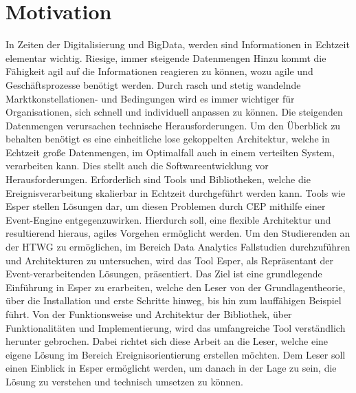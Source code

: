 \chapter{Motivation}
In Zeiten der Digitalisierung und BigData, werden sind Informationen in Echtzeit elementar wichtig.
Riesige, immer steigende Datenmengen
Hinzu kommt die Fähigkeit agil auf die Informationen reagieren zu können, wozu agile und Geschäftsprozesse benötigt werden. 
Durch rasch und stetig wandelnde Marktkonstellationen- und Bedingungen wird es immer wichtiger für Organisationen, sich schnell und individuell anpassen zu können. Die steigenden Datenmengen verursachen technische Herausforderungen. Um den Überblick zu behalten benötigt es eine einheitliche lose gekoppelten Architektur, welche in Echtzeit große Datenmengen, im Optimalfall auch in einem verteilten System, verarbeiten kann. Dies stellt auch die Softwareentwicklung vor Herausforderungen.
Erforderlich sind Tools und Bibliotheken, welche die Ereignisverarbeitung skalierbar in Echtzeit durchgeführt werden kann. Tools wie Esper stellen Lösungen dar, um diesen Problemen durch CEP mithilfe einer Event-Engine entgegenzuwirken. Hierdurch soll, eine flexible Architektur und resultierend hieraus, agiles Vorgehen ermöglicht werden.
Um den Studierenden an der HTWG zu ermöglichen, im Bereich Data Analytics Fallstudien durchzuführen und Architekturen zu untersuchen, wird das Tool Esper, als Repräsentant der Event-verarbeitenden Lösungen, präsentiert.
Das Ziel ist eine grundlegende Einführung in Esper zu erarbeiten, welche den Leser von der Grundlagentheorie, über die Installation und erste Schritte hinweg, bis hin zum lauffähigen Beispiel führt.
Von der Funktionsweise und Architektur der Bibliothek, über Funktionalitäten und Implementierung, wird das umfangreiche Tool verständlich herunter gebrochen. Dabei richtet sich diese Arbeit an die Leser, welche eine eigene Lösung im Bereich Ereignisorientierung erstellen möchten.
Dem Leser soll einen Einblick in Esper ermöglicht werden, um danach in der Lage zu sein, die Lösung zu verstehen und technisch umsetzen zu können.